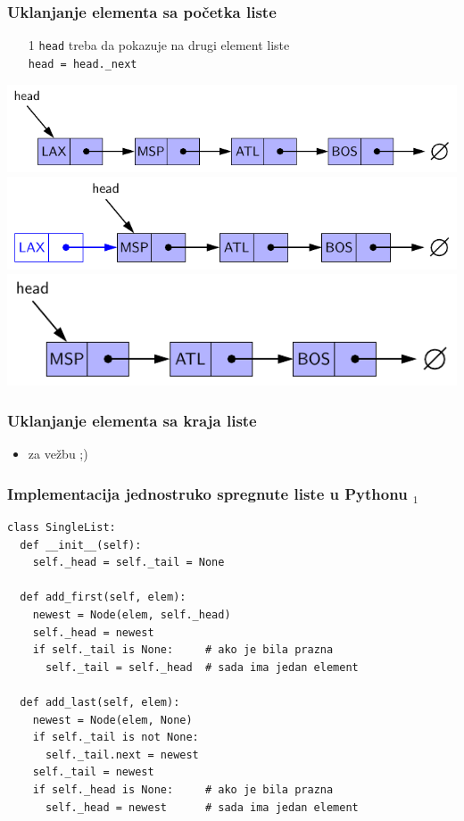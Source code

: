 \documentclass[compress]{beamer}
\begin{document}
\begin{frame}[fragile]
  \frametitle{Uklanjanje elementa sa početka liste}
  \begin{itemize}
    \item[1] \texttt{head} treba da pokazuje na drugi element liste \\
    \texttt{head = head.\_next}
  \end{itemize}
  \begin{center}
    \includegraphics[scale=0.7]{asp-07-pic05a.pdf} \\
    \includegraphics[scale=0.7]{asp-07-pic05b.pdf} \\
    \includegraphics[scale=0.7]{asp-07-pic05c.pdf}
  \end{center}
\end{frame}

\begin{frame}[fragile]
  \frametitle{Uklanjanje elementa sa kraja liste}
  \begin{itemize}
    \item za vežbu ;)
  \end{itemize}
\end{frame}

\begin{frame}
  \frametitle{Implementacija jednostruko spregnute liste u Pythonu $_1$}
\begin{verbatim}
class SingleList:
  def __init__(self):
    self._head = self._tail = None
  
  def add_first(self, elem):
    newest = Node(elem, self._head)
    self._head = newest
    if self._tail is None:     # ako je bila prazna 
      self._tail = self._head  # sada ima jedan element
    
  def add_last(self, elem):
    newest = Node(elem, None)
    if self._tail is not None:
      self._tail.next = newest
    self._tail = newest
    if self._head is None:     # ako je bila prazna
      self._head = newest      # sada ima jedan element
      
\end{verbatim}
\end{frame}
\end{document}
